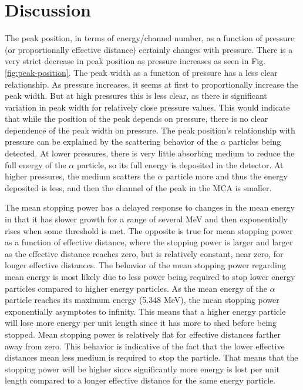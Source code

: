 \section{Discussion}

The peak position, in terms of energy/channel number, as a function of pressure (or proportionally effective distance) certainly changes with pressure. There is a very strict decrease in peak position as pressure increases as seen in Fig. \ref{fig:peak-position}. The peak width as a function of pressure has a less clear relationship. As pressure increases, it seems at first to proportionally increase the peak width. But at high pressures this is less clear, as there is significant variation in peak width for relatively close pressure values. This would indicate that while the position of the peak depends on pressure, there is no clear dependence of the peak width on pressure. The peak position’s relationship with pressure can be explained by the scattering behavior of the $\alpha$ particles being detected. At lower pressures, there is very little absorbing medium to reduce the full energy of the $\alpha$ particle, so its full energy is deposited in the detector. At higher pressures, the medium scatters the $\alpha$ particle more and thus the energy deposited is less, and then the channel of the peak in the MCA is smaller.

The mean stopping power has a delayed response to changes in the mean energy in that it has slower growth for a range of several MeV and then exponentially rises when some threshold is met. The opposite is true for mean stopping power as a function of effective distance, where the stopping power is larger and larger as the effective distance reaches zero, but is relatively constant, near zero, for longer effective distances. The behavior of the mean stopping power regarding mean energy is most likely due to less power being required to stop lower energy particles compared to higher energy particles. As the mean energy of the $\alpha$ particle reaches its maximum energy (5.348 MeV), the mean stopping power exponentially asymptotes to infinity. This means that a higher energy particle will lose more energy per unit length since it has more to shed before being stopped. Mean stopping power is relatively flat for effective distances farther away from zero. This behavior is indicative of the fact that the lower effective distances mean less medium is required to stop the particle. That means that the stopping power will be higher since significantly more energy is lost per unit length compared to a longer effective distance for the same energy particle.

